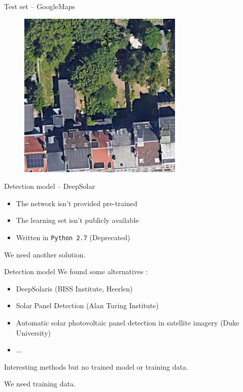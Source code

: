 \documentclass[12pt]{beamer}
\begin{document}
\begin{frame}{Test set -- GoogleMaps}
    \begin{figure}
        \centering
        \includegraphics[width=0.70\textwidth]{resources/png/googlemaps.png}
    \end{figure}
\end{frame}

\begin{frame}{Detection model -- DeepSolar}
    \begin{itemize}
        \item The network isn't provided pre-trained
        \item The learning set isn't publicly available
        \item Written in \texttt{Python 2.7} (Deprecated)
    \end{itemize}
    We need another solution.
\end{frame}

\begin{frame}{Detection model}
    We found some alternatives :
    \begin{itemize}
        \item DeepSolaris (BISS Institute, Heerlen)
        \item Solar Panel Detection (Alan Turing Institute)
        \item Automatic solar photovoltaic panel detection in satellite imagery (Duke University)
        \item ...
    \end{itemize}
    Interesting methods \alert{but} no trained model or training data.

    We \alert{need} training data.
\end{frame}
\end{document}
